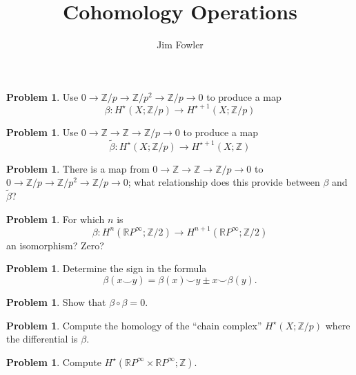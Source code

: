 \documentclass[12pt]{handout}
\title{Cohomology Operations}
\author{Jim Fowler}
\theoremstyle{definition}
\newtheorem{problem}[theorem]{Problem}
\newcommand{\RP}{\mathbb{R}P}
\newcommand{\Z}{\mathbb{Z}}
\begin{document}
\maketitle

\begin{problem}
  Use $0 \to \Z/p \to \Z/p^2 \to \Z/p \to 0$ to produce a map
\[
\beta : H^\star(X;\Z/p) \to H^{\star+1}(X;\Z/p)
\]
\end{problem}

\vfill

\begin{problem}
  Use $0 \to \Z \to \Z \to \Z/p \to 0$ to produce a map
  \[
  \tilde{\beta} : H^\star(X;\Z/p) \to H^{\star+1}(X;\Z)
  \]
\end{problem}

\vfill

\begin{problem}
  There is a map from $0 \to \Z \to \Z \to \Z/p \to 0$ to $0 \to \Z/p
  \to \Z/p^2 \to \Z/p \to 0$; what relationship does this provide
  between $\beta$ and $\tilde{\beta}$?
\end{problem}

\vfill

\begin{problem}
  For which $n$ is
  \[
  \beta : H^n(\RP^\infty;\Z/2) \to H^{n+1}(\RP^\infty;\Z/2)
  \]
  an isomorphism?  Zero?
\end{problem}

\vfill

\begin{problem}
  Determine the sign in the formula
  \[ 
  \beta(x \smallsmile y) = \beta(x) \smallsmile y \pm x \smallsmile \beta(y).
  \]
\end{problem}

\vfill

\begin{problem}
  Show that $\beta \circ \beta = 0$.
\end{problem}

\vfill

\begin{problem}
  Compute the homology of the ``chain complex'' $H^\star(X;\Z/p)$
  where the differential is $\beta$.
\end{problem}

\vfill

\begin{problem}
  Compute $H^\star(\RP^\infty \times \RP^\infty ; \Z)$.
\end{problem}

\pagebreak
\null
\end{document}
